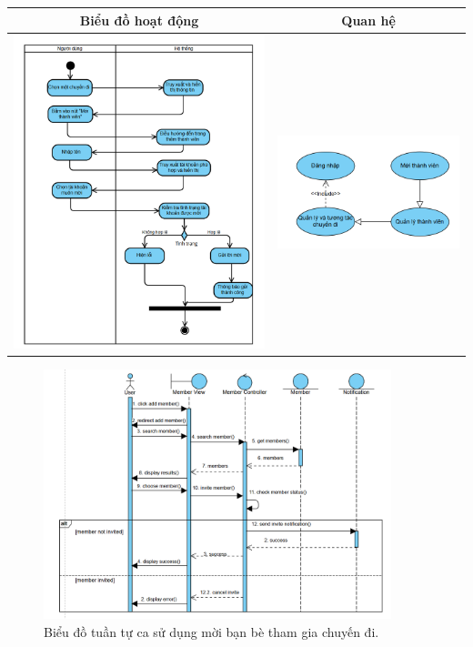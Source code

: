 \noindent 
\begin{tabular}{| c | c |}
    \hline
    \textbf{Biểu đồ hoạt động} & \textbf{Quan hệ} \\ 
    \hline
    \includegraphics[width=0.5\linewidth]{figures/c3/3-3-14-ad.png} 
    & 
    \includegraphics[width=0.45\linewidth]{figures/c3/3-3-14-rd.png} \\ 
    \hline
\end{tabular}

\vspace{0.8cm}

\begin{figure}[H]
    \centering  
    \includegraphics[width=0.9\textwidth]{figures/c3/3-3-14-sd.png}
    \caption{Biểu đồ tuần tự ca sử dụng mời bạn bè tham gia chuyến đi.}
    \label{fig:3-3-14-sequence-diagram}
\end{figure}